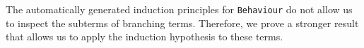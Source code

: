 \documentclass[runningheads]{llncs}
\begin{document}

The automatically generated induction principles for \lstinline+Behaviour+ do not allow us to inspect the subterms of branching terms. Therefore, we prove a stronger result that allows us to apply the induction hypothesis to these terms.

\end{document}

